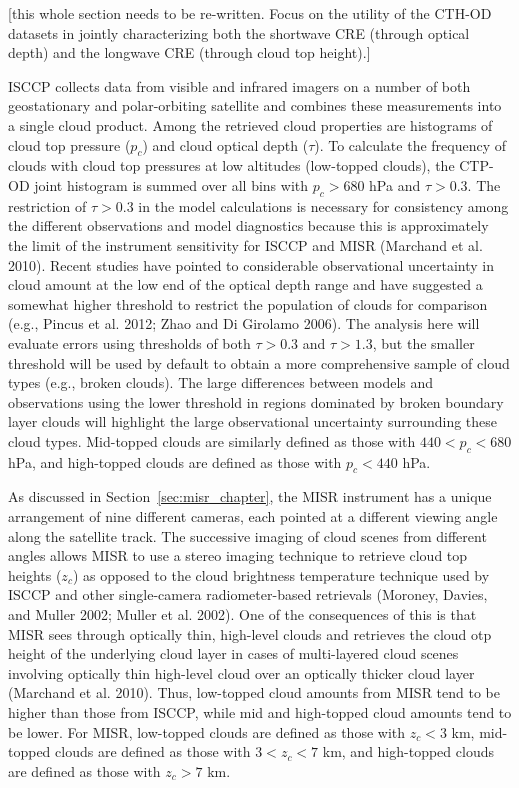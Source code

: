 {[}this whole section needs to be re-written. Focus on the utility of
the CTH-OD datasets in jointly characterizing both the shortwave CRE
(through optical depth) and the longwave CRE (through cloud top
height).{]}

ISCCP collects data from visible and infrared imagers on a number of
both geostationary and polar-orbiting satellite and combines these
measurements into a single cloud product. Among the retrieved cloud
properties are histograms of cloud top pressure (\(p_c\)) and cloud
optical depth (\(\tau\)). To calculate the frequency of clouds with
cloud top pressures at low altitudes (low-topped clouds), the CTP-OD
joint histogram is summed over all bins with \(p_c > 680\) hPa and
\(\tau > 0.3\). The restriction of \(\tau > 0.3\) in the model
calculations is necessary for consistency among the different
observations and model diagnostics because this is approximately the
limit of the instrument sensitivity for ISCCP and MISR (Marchand et al.
2010). Recent studies have pointed to considerable observational
uncertainty in cloud amount at the low end of the optical depth range
and have suggested a somewhat higher threshold to restrict the
population of clouds for comparison (e.g., Pincus et al. 2012; Zhao and
Di Girolamo 2006). The analysis here will evaluate errors using
thresholds of both \(\tau > 0.3\) and \(\tau > 1.3\), but the smaller
threshold will be used by default to obtain a more comprehensive sample
of cloud types (e.g., broken clouds). The large differences between
models and observations using the lower threshold in regions dominated
by broken boundary layer clouds will highlight the large observational
uncertainty surrounding these cloud types. Mid-topped clouds are
similarly defined as those with \(440 < p_c < 680\) hPa, and high-topped
clouds are defined as those with \(p_c < 440\) hPa.

As discussed in Section~\ref{sec:misr_chapter}, the MISR instrument has
a unique arrangement of nine different cameras, each pointed at a
different viewing angle along the satellite track. The successive
imaging of cloud scenes from different angles allows MISR to use a
stereo imaging technique to retrieve cloud top heights (\(z_c\)) as
opposed to the cloud brightness temperature technique used by ISCCP and
other single-camera radiometer-based retrievals (Moroney, Davies, and
Muller 2002; Muller et al. 2002). One of the consequences of this is
that MISR sees through optically thin, high-level clouds and retrieves
the cloud otp height of the underlying cloud layer in cases of
multi-layered cloud scenes involving optically thin high-level cloud
over an optically thicker cloud layer (Marchand et al. 2010). Thus,
low-topped cloud amounts from MISR tend to be higher than those from
ISCCP, while mid and high-topped cloud amounts tend to be lower. For
MISR, low-topped clouds are defined as those with \(z_c < 3\) km,
mid-topped clouds are defined as those with \(3 < z_c < 7\) km, and
high-topped clouds are defined as those with \(z_c > 7\) km.

